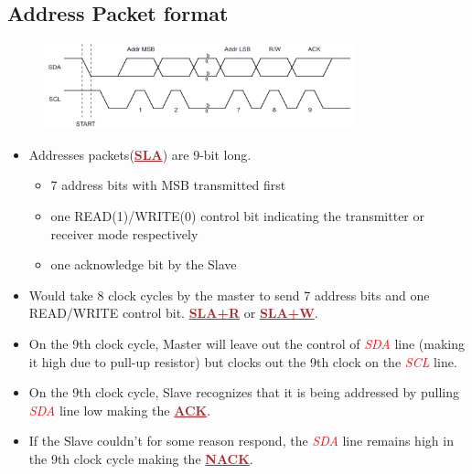 \documentclass{article}
\newcommand{\pinFormat}[1]{\emph{\textcolor{red}{#1}}}
\newcommand{\iicFormat}[1]{\textbf{\textcolor{brown}{\underline{#1}}}}
\begin{document}
\subsection{Address Packet format}
    \begin{figure}[H]
        \begin{center}
            \includegraphics[width=0.8\textwidth]{i2cAddressPacketFormat}
        \end{center}
    \end{figure}
\begin{itemize}
	\item Addresses packets(\iicFormat{SLA}) are 9-bit long.
	\begin{itemize}
		\item 7 address bits with MSB transmitted first
		\item one READ(1)/WRITE(0) control bit indicating the transmitter or receiver mode respectively
		\item one acknowledge bit by the Slave	
	\end{itemize}	
	\item Would take 8 clock cycles by the master to send 7 address bits and one READ/WRITE control bit. \iicFormat{SLA+R} or \iicFormat{SLA+W}.
	\item On the 9th clock cycle, Master will leave out the control of \pinFormat{SDA} line (making it high due to pull-up resistor) but clocks out the 9th clock on the \pinFormat{SCL} line.
	\item On the 9th clock cycle, Slave recognizes that it is being addressed by pulling \pinFormat{SDA} line low making the \iicFormat{ACK}.
	\item If the Slave couldn’t for some reason respond, the \pinFormat{SDA} line remains high in the 9th clock cycle making the \iicFormat{NACK}.
\end{itemize}
\end{document}
